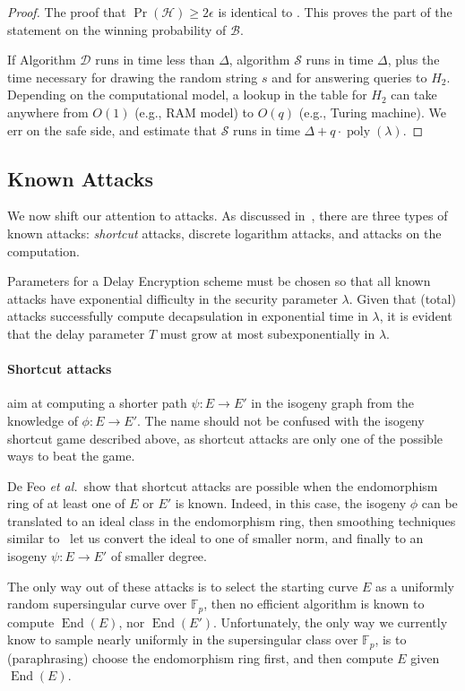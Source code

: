 \documentclass{llncs}
\newcommand{\F}{\mathbb{F}}
\DeclareMathOperator{\End}{End}
\DeclareMathOperator{\poly}{poly}
\begin{document}
\begin{proof}
  The proof that $\Pr(\mathcal{H})\ge 2\epsilon$ is identical to
  \cite[Lemma~4.3, Claim~2]{doi:10.1137/S0097539701398521}. %
  This proves the part of the statement on the winning probability of
  $\mathcal{B}$.
  
  If Algorithm $\mathcal{D}$ runs in time less than $\Delta$,
  algorithm $\mathcal{S}$ runs in time $\Delta$, plus the time
  necessary for drawing the random string $s$ and for answering
  queries to $H_2$. %
  Depending on the computational model, a lookup in the table for
  $H_2$ can take anywhere from $O(1)$ (e.g., RAM model) to $O(q)$
  (e.g., Turing machine). %
  We err on the safe side, and estimate that $\mathcal{S}$ runs in
  time $\Delta + q\cdot\poly(\lambda)$.
\end{proof}


\subsection{Known Attacks}
We now shift our attention to attacks. %
As discussed in~\cite{10.1007/978-3-030-34578-5_10}, there are three
types of known attacks: \emph{shortcut} attacks, discrete logarithm
attacks, and attacks on the computation.

Parameters for a Delay Encryption scheme must be chosen so that all
known attacks have exponential difficulty in the security parameter
$\lambda$. %
Given that (total) attacks successfully compute decapsulation in
exponential time in $\lambda$, it is evident that the delay parameter
$T$ must grow at most subexponentially in $\lambda$.

\paragraph{Shortcut attacks} aim at computing a shorter path
$\psi:E\to E'$ in the isogeny graph from the knowledge of
$\phi:E\to E'$. %
The name should not be confused with the isogeny shortcut game
described above, as shortcut attacks are only one of the possible ways
to beat the game.

De Feo \emph{et al.}\ show that shortcut attacks are possible when the
endomorphism ring of at least one of $E$ or $E'$ is known. %
Indeed, in this case, the isogeny $\phi$ can be translated to an ideal
class in the endomorphism ring, then smoothing techniques similar
to~\cite{kohel2014quaternion} let us convert the ideal to one of
smaller norm, and finally to an isogeny $\psi:E\to E'$ of smaller
degree.

The only way out of these attacks is to select the starting curve $E$
as a uniformly random supersingular curve over $\F_p$, then no
efficient algorithm is known to compute $\End(E)$, nor $\End(E')$. %
Unfortunately, the only way we currently know to sample nearly
uniformly in the supersingular class over $\F_p$, is to
(paraphrasing) choose the endomorphism ring first, and then compute
$E$ given $\End(E)$.
\end{document}
